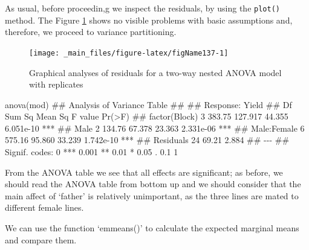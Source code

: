 \documentclass[a4paper,12pt,oneside]{book}
\newenvironment{Shaded}{\begin{snugshade}}{\end{snugshade}}
\newcommand{\DocumentationTok}[1]{#1}
\newcommand{\FunctionTok}[1]{#1}
\newcommand{\NormalTok}[1]{#1}
\begin{document}
\normalsize

As usual, before proceedin,g we inspect the residuals, by using the \texttt{plot()} method. The Figure \ref{fig:figName137} shows no visible problems with basic assumptions and, therefore, we proceed to variance partitioning.

\begin{figure}

{\centering \texttt{[image: \_main\_files/figure-latex/figName137-1]} 

}

\caption{Graphical analyses of residuals for a two-way nested ANOVA model with replicates}\label{fig:figName137}
\end{figure}

\vspace{12pt}

\begin{Shaded}
\begin{Highlighting}[]
\FunctionTok{anova}\NormalTok{(mod)}
\DocumentationTok{\#\# Analysis of Variance Table}
\DocumentationTok{\#\# }
\DocumentationTok{\#\# Response: Yield}
\DocumentationTok{\#\#               Df Sum Sq Mean Sq F value    Pr(\textgreater{}F)    }
\DocumentationTok{\#\# factor(Block)  3 383.75 127.917  44.355 6.051e{-}10 ***}
\DocumentationTok{\#\# Male           2 134.76  67.378  23.363 2.331e{-}06 ***}
\DocumentationTok{\#\# Male:Female    6 575.16  95.860  33.239 1.742e{-}10 ***}
\DocumentationTok{\#\# Residuals     24  69.21   2.884                      }
\DocumentationTok{\#\# {-}{-}{-}}
\DocumentationTok{\#\# Signif. codes:  0 \textquotesingle{}***\textquotesingle{} 0.001 \textquotesingle{}**\textquotesingle{} 0.01 \textquotesingle{}*\textquotesingle{} 0.05 \textquotesingle{}.\textquotesingle{} 0.1 \textquotesingle{} \textquotesingle{} 1}
\end{Highlighting}
\end{Shaded}

From the ANOVA table we see that all effects are significant; as before, we should read the ANOVA table from bottom up and we should consider that the main affect of `father' is relatively unimportant, as the three lines are mated to different female lines.

We can use the function `emmeans()' to calculate the expected marginal means and compare them.

\vspace{12pt}
\end{document}
